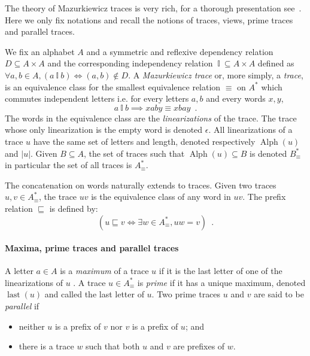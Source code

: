 \documentclass[a4paper,UKenglish]{lipics-v2016}
\newcommand{\ind}{~\mathbb{I}~}
\newcommand{\pref}{\sqsubseteq}
\DeclareMathOperator{\last}{last}
\DeclareMathOperator{\alphabet}{Alph}
\begin{document}
The theory of Mazurkiewicz traces is very rich,
for a thorough presentation see~\cite{thebook}.
Here we only fix notations and recall the notions of traces, views, prime traces and parallel traces.


We fix an alphabet $A$ and a symmetric and reflexive dependency relation $D \subseteq A\times A$
and the corresponding independency relation $\ind \subseteq A\times A$ defined as $
\forall a,b\in A, (a \ind b) \iff (a,b)\not\in D$.
A  \emph{Mazurkiewicz trace}
or, more simply, a \emph{trace},
is an equivalence class
for the smallest equivalence relation $\equiv$ on $A^*$ 
which commutes independent letters i.e.
for every letters $a,b$
and every words $x,y$,
\[
a \ind b \implies
xaby\equiv
xbay\enspace. 
\]
The words in the equivalence class are the \emph{linearizations} of the trace.
The trace whose only linearization is the empty word is 
denoted $\epsilon$.
All linearizations of a trace $u$ have the same set of letters and length, denoted respectively $\alphabet(u)$ and $|u|$.
Given $B\subseteq A$,
the set of traces such that
$\alphabet(u)\subseteq B$
is denoted $B_\equiv^*$
in particular the set of all traces is 
$A^*_\equiv$.

The concatenation on words naturally extends to traces.
Given two traces $u,v\in A^*_\equiv$, the trace $uv$ is the equivalence class of any word in $uv$.
The prefix relation $\pref$ is defined by:
\[
(u\pref v \iff \exists w \in A^*_\equiv, uw= v)\enspace.
\]


\paragraph*{Maxima, prime traces and parallel traces}
A letter $a\in A$ is a \emph{maximum} of a trace $u$ if it is the last letter of one of the linearizations of $u$ .
A trace $u\in A_\equiv^*$ is \emph{prime} if it has a unique maximum,
denoted $\last(u)$
and called the last letter of $u$.
Two prime traces $u$ and $v$ are said to be \emph{parallel}
if 
\begin{itemize}
\item
neither 
$u$ is a prefix of $v$ nor 
$v$ is a prefix of $u$; and
\item
there is a trace $w$ such that both $u$ and $v$ are prefixes of $w$.
\end{itemize}
\end{document}

